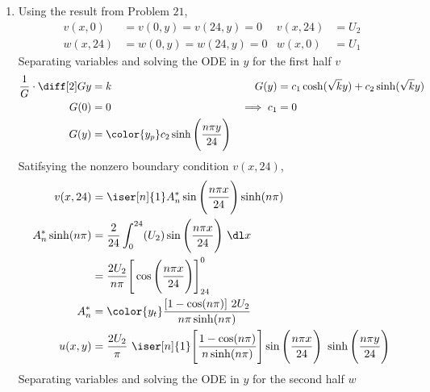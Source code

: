 \begin{enumerate}
    \item Using the result from Problem $ 21 $,
          \begin{align}
              v(x, 0)  & = v(0, y) = v(24, y) = 0 &
              v(x, 24) & = U_2                      \\
              w(x, 24) & = w(0, y) = w(24, y) = 0 &
              w(x, 0)  & = U_1
          \end{align}
          Separating variables and solving the ODE in $ y $ for the first half $ v $
          \begin{align}
              \frac{1}{G} \cdot \diff[2] Gy & = k                           &
              G(y)                          & = c_1 \cosh(\sqrt{k}y)
              + c_2\sinh(\sqrt{k}y)                                           \\
              G(0)                          & = 0                           &
              \implies c_1                  & = 0                             \\
              G(y)                          & = \color{y_p} c_2 \sinh\Bigg(
              \frac{n\pi y}{24}\Bigg)
          \end{align}
          Satifsying the nonzero boundary condition $ v(x, 24) $,
          \begin{align}
              v(x, 24)          & = \iser[n]{1} A_n^* \sin\Bigg(
              \frac{n\pi x}{24} \Bigg) \sinh(n\pi)                                    \\
              A_n^* \sinh(n\pi) & = \frac{2}{24} \int_{0}^{24} (U_2)\sin\Bigg(
              \frac{n\pi x}{24}\Bigg)\ \dl x                                          \\
                                & = \frac{2U_2}{n\pi} \Bigg[ \cos\Bigg( \frac{n\pi x}
              {24}\Bigg) \Bigg]_{24}^0                                                \\
              A_n^*             & = \color{y_t} \frac{[1 - \cos(n\pi)]\ 2U_2}
              {n\pi \sinh(n\pi)}                                                      \\
              u(x, y)           & = \frac{2U_2}{\pi}\ \iser[n]{1} \Bigg[
                  \frac{1 - \cos(n\pi)}{n\sinh(n\pi)}\Bigg] \sin\Bigg( \frac{n\pi x}
              {24}\Bigg)\ \sinh\Bigg( \frac{n\pi y}{24} \Bigg)
          \end{align}
          Separating variables and solving the ODE in $ y $ for the second half $ w $
          \begin{align}

\end{align}
\end{enumerate}
